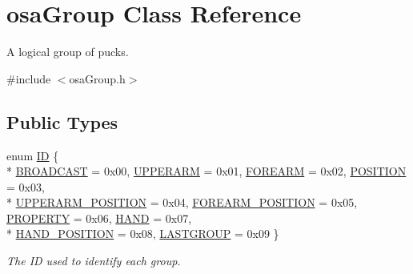 \hypertarget{classosa_group}{}\section{osa\+Group Class Reference}
\label{classosa_group}


A logical group of pucks.  




{\ttfamily \#include $<$osa\+Group.\+h$>$}

\subsection*{Public Types}
\begin{DoxyCompactItemize}
\item 
enum \hyperlink{classosa_group_a642da327f9e3c40d46293432b949f199}{I\+D} \{ \\*
\hyperlink{classosa_group_a642da327f9e3c40d46293432b949f199ae9534ab59a1ea39b9cee0501a8cd004c}{B\+R\+O\+A\+D\+C\+A\+S\+T} = 0x00, 
\hyperlink{classosa_group_a642da327f9e3c40d46293432b949f199a20d3ec176caaf6065d5e80a30b3a2d65}{U\+P\+P\+E\+R\+A\+R\+M} = 0x01, 
\hyperlink{classosa_group_a642da327f9e3c40d46293432b949f199a18cea4e0d67419684d28db8281ba6877}{F\+O\+R\+E\+A\+R\+M} = 0x02, 
\hyperlink{classosa_group_a642da327f9e3c40d46293432b949f199a99ec87c699a923e3bdd6f4e4b230e22b}{P\+O\+S\+I\+T\+I\+O\+N} = 0x03, 
\\*
\hyperlink{classosa_group_a642da327f9e3c40d46293432b949f199a57b3c6641deb0680e0b140eefa32d0b8}{U\+P\+P\+E\+R\+A\+R\+M\+\_\+\+P\+O\+S\+I\+T\+I\+O\+N} = 0x04, 
\hyperlink{classosa_group_a642da327f9e3c40d46293432b949f199a8123388fa93b393a7725578d1caf458e}{F\+O\+R\+E\+A\+R\+M\+\_\+\+P\+O\+S\+I\+T\+I\+O\+N} = 0x05, 
\hyperlink{classosa_group_a642da327f9e3c40d46293432b949f199a69e6ba263f5a6f04a4e480257c307cbb}{P\+R\+O\+P\+E\+R\+T\+Y} = 0x06, 
\hyperlink{classosa_group_a642da327f9e3c40d46293432b949f199aa463fb50faa1db162412a894a01f62b7}{H\+A\+N\+D} = 0x07, 
\\*
\hyperlink{classosa_group_a642da327f9e3c40d46293432b949f199a9e08fc09ee112b51b9f941c75ca880e9}{H\+A\+N\+D\+\_\+\+P\+O\+S\+I\+T\+I\+O\+N} = 0x08, 
\hyperlink{classosa_group_a642da327f9e3c40d46293432b949f199a4f5433f5002cb11361c614858e29b226}{L\+A\+S\+T\+G\+R\+O\+U\+P} = 0x09
 \}
\begin{DoxyCompactList}\small\item\em The I\+D used to identify each group. \end{DoxyCompactList}\item 

\end{DoxyCompactItemize}
